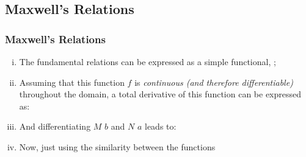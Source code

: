 \documentclass[10pt,compress,handout,unknownkeysallowed]{beamer}
\begin{document}
\subsection{Maxwell's Relations}\label{Module03:Section:MaxwellRelation}

\begin{frame}
  \frametitle{Maxwell's Relations}
      \begin{enumerate}[i)]
          \item<1-> The fundamental relations can be expressed as a simple functional, ;
          \item<2-> Assuming that this function $f$ is {\it continuous (and therefore differentiable)} throughout the domain, a total derivative of this function can be expressed as: 
          \item<3-> And differentiating $M$ \wrt $b$ and $N$ \wrt $a$ leads to:
          \item<4-> Now, just using the similarity between the functions
      \end{enumerate}

\end{frame}
\normalsize
\end{document}
